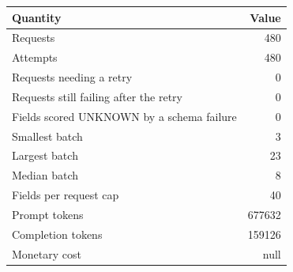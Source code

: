 \begingroup\small\setlength{\tabcolsep}{4pt}
\begin{tabular}{lr}
\toprule
\textbf{Quantity} & \textbf{Value} \\
\midrule
Requests & 480 \\  %
Attempts & 480 \\  %
Requests needing a retry & 0 \\  %
Requests still failing after the retry & 0 \\  %
Fields scored UNKNOWN by a schema failure & 0 \\  %
Smallest batch & 3 \\  %
Largest batch & 23 \\  %
Median batch & 8 \\  %
Fields per request cap & 40 \\  %
Prompt tokens & 677632 \\  %
Completion tokens & 159126 \\  %
\midrule
Monetary cost & null \\
\bottomrule
\end{tabular}
\endgroup
\par\smallskip{}
